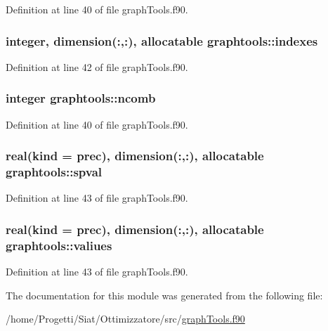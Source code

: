 Definition at line 40 of file graph\-Tools.\-f90.

\hypertarget{classgraphtools_a06bc686e600e3a5ff5ca5cc86ac94872}{
\subsubsection[{indexes}]{\setlength{\rightskip}{0pt plus 5cm}integer, dimension(\-:,\-:), allocatable graphtools\-::indexes}}\label{classgraphtools_a06bc686e600e3a5ff5ca5cc86ac94872}


Definition at line 42 of file graph\-Tools.\-f90.

\hypertarget{classgraphtools_a2b525a855ff204b1f0888367afad341b}{
\subsubsection[{ncomb}]{\setlength{\rightskip}{0pt plus 5cm}integer graphtools\-::ncomb}}\label{classgraphtools_a2b525a855ff204b1f0888367afad341b}


Definition at line 40 of file graph\-Tools.\-f90.

\hypertarget{classgraphtools_aa469ea301df7677b90448dfa88f26153}{
\subsubsection[{spval}]{\setlength{\rightskip}{0pt plus 5cm}real(kind = prec), dimension(\-:,\-:), allocatable graphtools\-::spval}}\label{classgraphtools_aa469ea301df7677b90448dfa88f26153}


Definition at line 43 of file graph\-Tools.\-f90.

\hypertarget{classgraphtools_a637c15ec541e2e87680f381c2a542e27}{
\subsubsection[{valiues}]{\setlength{\rightskip}{0pt plus 5cm}real(kind = prec), dimension(\-:,\-:), allocatable graphtools\-::valiues}}\label{classgraphtools_a637c15ec541e2e87680f381c2a542e27}


Definition at line 43 of file graph\-Tools.\-f90.



The documentation for this module was generated from the following file\-:\begin{DoxyCompactItemize}
\item 
/home/\-Progetti/\-Siat/\-Ottimizzatore/src/\hyperlink{graph_tools_8f90}{graph\-Tools.\-f90}\end{DoxyCompactItemize}
